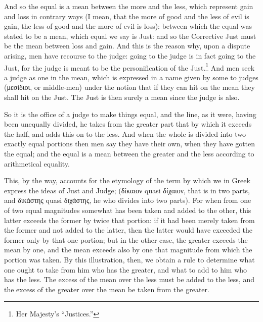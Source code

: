 And so the equal is a mean between the more and the less, which represent gain
and loss in contrary ways (I mean, that the more of good and the less of evil
is gain, the less of good and the more of evil is loss): between which the
equal was stated to be a mean, which equal we say is Just: and so the
Corrective Just must be the mean between loss and gain. And this is the reason
why, upon a dispute arising, men have recourse to the judge: going to the judge
is in fact going to the Just, for the judge is meant to be the personification
of the Just.\footnote{Her Majesty’s “Justices.”}
And men seek a judge as one in the mean, which is expressed in a name given by
some to judges (μεσίδιοι, or
middle-men) under the notion that if they can hit on the mean they shall hit on
the Just. The Just is then surely a mean since the judge is also.

So it is the office of a judge to make things equal, and the line, as it were,
having been unequally divided, he takes from the greater part that by which it
exceeds the half, and adds this on to the less. And when the whole is divided
into two exactly equal portions then men say they have their own, when they
have gotten the equal; and the equal is a mean between the greater and the less
according to arithmetical equality.

This, by the way, accounts for the etymology of the term by which we in Greek
express the ideas of Just and Judge;
(δίκαιον quasi
δίχαιον, that is in two parts, and
δικάστης quasi
διχάστης, he who divides into two
parts). For when from one of two equal magnitudes somewhat has been taken and
added to the other, this latter exceeds the former by twice that portion: if it
had been merely taken from the former and not added to the latter, then the
latter would have exceeded the former only by that one portion; but in the
other case, the greater exceeds the mean by one, and the mean exceeds also by
one that magnitude from which the portion was taken. By this illustration,
then, we obtain a rule to determine what one ought to take from him who has the
greater, and what to add to him who has the less. The excess of the mean over
the less must be added to the less, and the excess of the greater over the mean
be taken from the greater.


